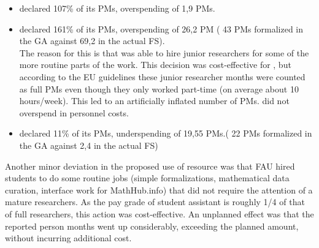 \begin{itemize}
\item {} declared 107\% of its PMs, overspending of 1,9 PMs.
\item {} declared 161\% of its PMs, overspending of 26,2 PM ( 43 PMs
formalized in the GA against 69,2 in the actual FS).\\
The reason for this is that  was able to hire junior researchers for some of the more routine parts of the work.
This decision was cost-effective for \pn, but according to the EU guidelines these junior researcher months were counted as full PMs even though they only worked part-time (on average about 10 hours/week).
This led to an artificially inflated number of PMs.  did not overspend in personnel costs.
\item {} declared 11\% of its PMs, underspending of 19,55 PMs.( 22 PMs
formalized in the GA against 2,4 in the actual FS)

\end{itemize}




Another minor deviation in the proposed use of resource was that FAU hired students to do
some routine jobs (simple formalizations, mathematical data curation, interface work for
MathHub.info) that did not require the attention of a mature researchers. As the pay grade
of student assistant is roughly 1/4 of that of full researchers, this action was
cost-effective. An unplanned effect was that the reported person months went up
considerably, exceeding the planned amount, without incurring additional cost.

